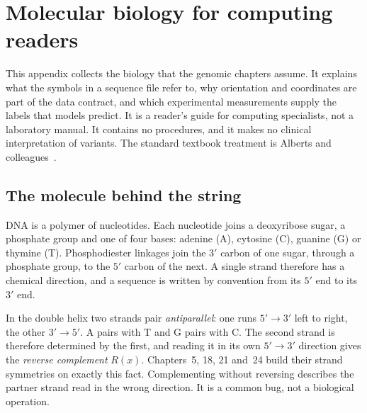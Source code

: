 \chapter{Molecular biology for computing readers}
\label{book:appendixA}

This appendix collects the biology that the genomic chapters assume. It explains what
the symbols in a sequence file refer to, why orientation and coordinates are part of
the data contract, and which experimental measurements supply the labels that models
predict. It is a reader's guide for computing specialists, not a laboratory manual. It
contains no procedures, and it makes no clinical interpretation of variants. The
standard textbook treatment is Alberts and colleagues~\cite{albertscontrol}.

\section{The molecule behind the string}
DNA is a polymer of nucleotides. Each nucleotide joins a deoxyribose sugar, a phosphate
group and one of four bases: adenine (A), cytosine (C), guanine (G) or thymine (T).
Phosphodiester linkages join the $3'$ carbon of one sugar, through a phosphate group, to
the $5'$ carbon of the next.
A single strand therefore has a chemical direction, and a sequence is written by
convention from its $5'$ end to its $3'$ end.

In the double helix two strands pair \emph{antiparallel}: one runs $5'\to3'$ left to
right, the other $3'\to5'$. A pairs with T and G pairs with C. The second strand is
therefore determined by the first, and reading it in its own $5'\to3'$ direction gives
the \emph{reverse complement} $R(x)$. Chapters~5, 18, 21 and~24 build their strand
symmetries on exactly this fact. Complementing without reversing describes the partner
strand read in the wrong direction. It is a common bug, not a biological operation.


